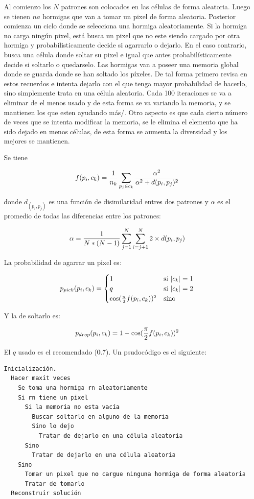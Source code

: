 Al comienzo los $N$ patrones son colocados
en las c\'elulas de forma aleatoria. Luego se tienen $na$ hormigas que van a tomar
un pixel de forma aleatoria. Posterior comienza un ciclo donde se selecciona una hormiga
aleatoriamente. Si la hormiga no carga ning\'un pixel, est\'a busca un pixel
que no este siendo cargado por otra hormiga y probabilisticamente decide si agarrarlo o dejarlo.
En el caso contrario, busca una c\'elula donde soltar su pixel e igual que antes
probabil\'isticamente decide si soltarlo o quedarselo. Las hormigas van a poseer
una memoria global donde se guarda donde se han soltado los p\'ixeles.
De tal forma primero revisa en estos recuerdos e intenta dejarlo con el que tenga 
mayor probabilidad de hacerlo, sino simplemente trata en una c\'elula
aleatoria. Cada 100 iteraciones se va a eliminar de
el menos usado y de esta forma se va variando la memoria, y se mantienen los que
esten ayudando m\'as/. Otro aspecto es que cada cierto n\'umero de veces que
se intenta modificar la memoria, se le elimina el elemento que ha sido dejado en menos c\'elulas,
de esta forma se aumenta la diversidad y los mejores se mantienen.

Se tiene

\[
f(p_i,c_k) = {1 \over n_k} \sum_{p_j \in c_k} {\alpha^2 \over {\alpha^2 + d(p_i,p_j)^2}}
\]

donde $d_(p_i,p_j)$ es una funci\'on de disimilaridad
entres dos patrones y $\alpha$ es el promedio de todas
las diferencias entre los patrones:

\[
\alpha = {1 \over {N*(N-1)}} \sum_{j=1}^N \sum_{i=j+1}^N {2 \times d(p_i,p_j)}
\]

La probabilidad de agarrar un pixel es:

\[
p_{pick}(p_i,c_k) = 
\begin{cases}
1 & \text{si } |c_k| = 1 \\
q & \text{si } |c_k| = 2 \\
\cos( {\pi \over 2} f(p_i, c_k) )^2  & \text {sino}
\end{cases}
\]

Y la de soltarlo es:

\[
p_{drop}(p_i,c_k) = 1 - \cos( {\pi \over 2} f(p_i, c_k) )^2 
\]

El $q$ usado es el recomendado (0.7). Un psudoc\'odigo es
el siguiente:

\begin{lstlisting}[mathescape, language=Pascal]
  Inicialización.
  Hacer maxit veces
    Se toma una hormiga rn aleatoriamente
	Si rn tiene un pixel
	  Si la memoria no esta vacía
	    Buscar soltarlo en alguno de la memoria
		Sino lo dejo
		  Tratar de dejarlo en una célula aleatoria
	  Sino
	    Tratar de dejarlo en una célula aleatoria
	Sino
	  Tomar un pixel que no cargue ninguna hormiga de forma aleatoria
	  Tratar de tomarlo
  Reconstruir solución
\end{lstlisting}

